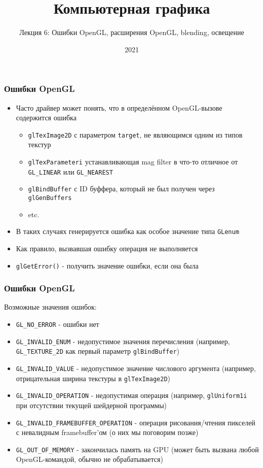 \documentclass{beamer}
\title{Компьютерная графика}
\subtitle{Лекция 6: Ошибки OpenGL, расширения OpenGL, blending, освещение}
\date{2021}
\begin{document}
\frame{\titlepage}

\begin{frame}[fragile]
\frametitle{Ошибки OpenGL}
\begin{itemize}
\item Часто драйвер может понять, что в определённом OpenGL-вызове содержится ошибка
\pause
\begin{itemize}
\item \verb|glTexImage2D| с параметром \verb|target|, не являющимся одним из типов текстур
\pause
\item \verb|glTexParameteri| устанавливающая mag filter в что-то отличное от \verb|GL_LINEAR| или \verb|GL_NEAREST|
\pause
\item \verb|glBindBuffer| с ID буффера, который не был получен через \verb|glGenBuffers|
\pause
\item etc.
\end{itemize}
\pause
\item В таких случаях генерируется ошибка как особое значение типа \verb|GLenum|
\pause
\item Как правило, вызвавшая ошибку операция не выполняется
\pause
\item \verb|glGetError()| - получить значение ошибки, если она была
\end{itemize}
\end{frame}

\begin{frame}[fragile]
\frametitle{Ошибки OpenGL}
Возможные значения ошибок:
\begin{itemize}
\item \verb|GL_NO_ERROR| - ошибки нет
\pause
\item \verb|GL_INVALID_ENUM| - недопустимое значения перечисления (например, \verb|GL_TEXTURE_2D| как первый параметр \verb|glBindBuffer|)
\pause
\item \verb|GL_INVALID_VALUE| - недопустимое значение числового аргумента (например, отрицательная ширина текстуры в \verb|glTexImage2D|)
\pause
\item \verb|GL_INVALID_OPERATION| - недопустимая операция (например, \verb|glUniform1i| при отсутствии текущей шейдерной программы)
\pause
\item \verb|GL_INVALID_FRAMEBUFFER_OPERATION| - операция рисования/чтения пикселей с невалидным framebuffer'ом (о них мы поговорим позже)
\pause
\item \verb|GL_OUT_OF_MEMORY| - закончилась память на GPU (может быть вызвана любой OpenGL-командой, обычно не обрабатывается)
\end{itemize}
\end{frame}
\end{document}
